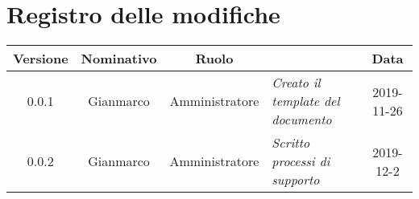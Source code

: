 \section*{Registro delle modifiche}
\renewcommand{\arraystretch}{1.8}

  \begin{longtable}{|c|c|c|p{3.8cm}|c|}
    \hline

    \rowcolor{header}
    \textbf{Versione} & \textbf{Nominativo} & \textbf{Ruolo} & \centering{\textbf{Descrizione}} & \textbf{Data}\\

    \hline

    0.0.1 & Gianmarco & Amministratore & \small{\textit{Creato il template del documento}} & 2019-11-26\\
    0.0.2 & Gianmarco & Amministratore & \small{\textit{Scritto processi di supporto}} & 2019-12-2\\

    \hline
  \end{longtable}
